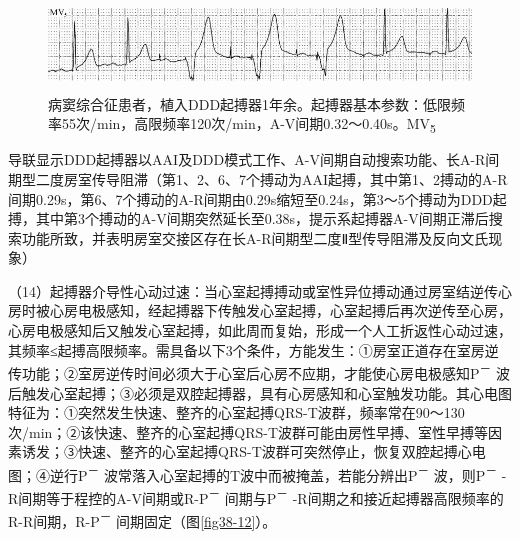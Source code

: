 \begin{figure}[!htbp]
 \centering
 \includegraphics[width=5.58333in,height=0.94792in]{./images/Image00614.jpg}
 \captionsetup{justification=centering}
 \caption{病窦综合征患者，植入DDD起搏器1年余。起搏器基本参数：低限频率55次/min，高限频率120次/min，A-V间期0.32～0.40s。MV\textsubscript{5}}
 \label{fig38-11}
  \end{figure} 
导联显示DDD起搏器以AAI及DDD模式工作、A-V间期自动搜索功能、长A-R间期型二度房室传导阻滞（第1、2、6、7个搏动为AAI起搏，其中第1、2搏动的A-R间期0.29s，第6、7个搏动的A-R间期由0.29s缩短至0.24s，第3～5个搏动为DDD起搏，其中第3个搏动的A-V间期突然延长至0.38s，提示系起搏器A-V间期正滞后搜索功能所致，并表明房室交接区存在长A-R间期型二度Ⅱ型传导阻滞及反向文氏现象）

（14）起搏器介导性心动过速：当心室起搏搏动或室性异位搏动通过房室结逆传心房时被心房电极感知，经起搏器下传触发心室起搏，心室起搏后再次逆传至心房，心房电极感知后又触发心室起搏，如此周而复始，形成一个人工折返性心动过速，其频率≤起搏高限频率。需具备以下3个条件，方能发生：①房室正道存在室房逆传功能；②室房逆传时间必须大于心室后心房不应期，才能使心房电极感知P\textsuperscript{－}
波后触发心室起搏；③必须是双腔起搏器，具有心房感知和心室触发功能。其心电图特征为：①突然发生快速、整齐的心室起搏QRS-T波群，频率常在90～130次/min；②该快速、整齐的心室起搏QRS-T波群可能由房性早搏、室性早搏等因素诱发；③快速、整齐的心室起搏QRS-T波群可突然停止，恢复双腔起搏心电图；④逆行P\textsuperscript{－}
波常落入心室起搏的T波中而被掩盖，若能分辨出P\textsuperscript{－}
波，则P\textsuperscript{－}
-R间期等于程控的A-V间期或R-P\textsuperscript{－}
间期与P\textsuperscript{－}
-R间期之和接近起搏器高限频率的R-R间期，R-P\textsuperscript{－}
间期固定（图\ref{fig38-12}）。

